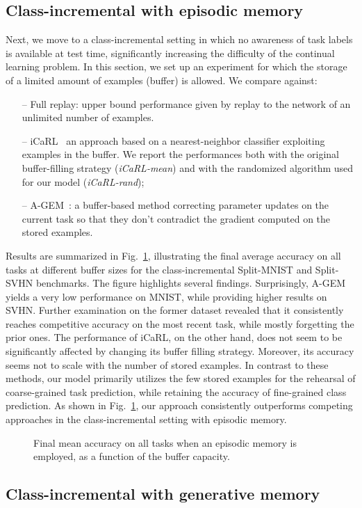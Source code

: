 \documentclass[10pt,twocolumn,letterpaper]{article}
\begin{document}
\subsection{Class-incremental with episodic memory}
Next, we move to a class-incremental setting in which no awareness of task labels is available at test time, significantly increasing the difficulty of the continual learning problem. In this section, we set up an experiment for which the storage of a limited amount of examples (buffer) is allowed.
We compare against:
\begin{itemize}[noitemsep]
    \item[--] Full replay: upper bound performance given by replay to the network of an unlimited number of examples.
    \item[--] iCaRL~\cite{icarl} an approach based on a nearest-neighbor classifier exploiting examples in the buffer. We report the performances both with the original buffer-filling strategy (\textit{iCaRL-mean}) and with the randomized algorithm used for our model (\textit{iCaRL-rand});
    \item[--] A-GEM~\cite{agem}: a buffer-based method correcting parameter updates on the current task so that they don't contradict the gradient computed on the stored examples.
\end{itemize}
Results are summarized in Fig.~\ref{fig:episodic memory_plots}, illustrating the final average accuracy on all tasks at different buffer sizes for the class-incremental Split-MNIST and Split-SVHN benchmarks. The figure highlights several findings. 
Surprisingly, A-GEM yields a very low performance on MNIST, while providing higher results on SVHN. Further examination on the former dataset revealed that it consistently reaches competitive accuracy on the most recent task, while mostly forgetting the prior ones. 
The performance of iCaRL, on the other hand, does not seem to be significantly affected by changing its buffer filling strategy. Moreover, its accuracy seems not to scale with the number of stored examples.
In contrast to these methods, our model primarily utilizes the few stored examples for the rehearsal of coarse-grained task prediction, while retaining the accuracy of fine-grained class prediction. As shown in Fig.~\ref{fig:episodic memory_plots}, our approach consistently outperforms competing approaches in the class-incremental setting with episodic memory.
\begin{figure}[t]
\centering
{}
\caption{Final mean accuracy on all tasks when an episodic memory is employed, as a function of the buffer capacity.}
\label{fig:episodic memory_plots}
\end{figure} \subsection{Class-incremental with generative memory}
\end{document}
